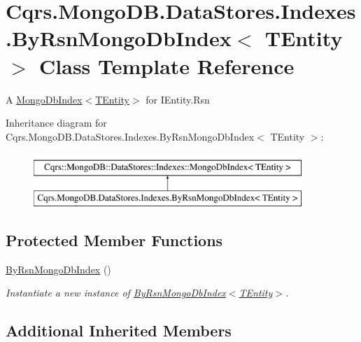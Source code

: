 \hypertarget{classCqrs_1_1MongoDB_1_1DataStores_1_1Indexes_1_1ByRsnMongoDbIndex}{}\section{Cqrs.\+Mongo\+D\+B.\+Data\+Stores.\+Indexes.\+By\+Rsn\+Mongo\+Db\+Index$<$ T\+Entity $>$ Class Template Reference}
\label{classCqrs_1_1MongoDB_1_1DataStores_1_1Indexes_1_1ByRsnMongoDbIndex}


A \hyperlink{classCqrs_1_1MongoDB_1_1DataStores_1_1Indexes_1_1MongoDbIndex_a61f4b17dd968f92e81562c70ae062a89_a61f4b17dd968f92e81562c70ae062a89}{Mongo\+Db\+Index$<$\+T\+Entity$>$} for I\+Entity.\+Rsn  


Inheritance diagram for Cqrs.\+Mongo\+D\+B.\+Data\+Stores.\+Indexes.\+By\+Rsn\+Mongo\+Db\+Index$<$ T\+Entity $>$\+:\begin{figure}[H]
\begin{center}
\leavevmode
\includegraphics[height=2.000000cm]{classCqrs_1_1MongoDB_1_1DataStores_1_1Indexes_1_1ByRsnMongoDbIndex}
\end{center}
\end{figure}
\subsection*{Protected Member Functions}
\begin{DoxyCompactItemize}
\item 
\hyperlink{classCqrs_1_1MongoDB_1_1DataStores_1_1Indexes_1_1ByRsnMongoDbIndex_acf6c8317e8ff8d9c3ffa592683e30665_acf6c8317e8ff8d9c3ffa592683e30665}{By\+Rsn\+Mongo\+Db\+Index} ()
\begin{DoxyCompactList}\small\item\em Instantiate a new instance of \hyperlink{classCqrs_1_1MongoDB_1_1DataStores_1_1Indexes_1_1ByRsnMongoDbIndex_acf6c8317e8ff8d9c3ffa592683e30665_acf6c8317e8ff8d9c3ffa592683e30665}{By\+Rsn\+Mongo\+Db\+Index$<$\+T\+Entity$>$}. \end{DoxyCompactList}\end{DoxyCompactItemize}
\subsection*{Additional Inherited Members}


